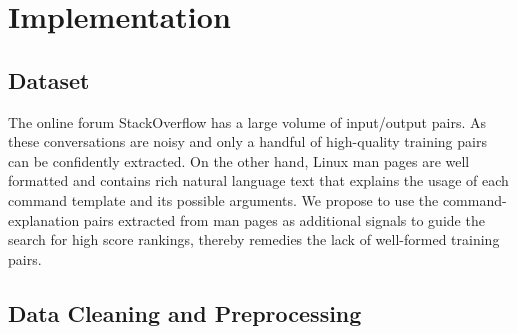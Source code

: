\section{Implementation}

\subsection{Dataset}

The online forum StackOverflow has a large volume of input/output pairs. As these conversations are noisy and only a handful of high-quality training pairs can be confidently extracted. On the other hand, Linux man pages are well formatted and contains rich natural language text that explains the usage of each command template and its possible arguments. We propose to use the command-explanation pairs extracted from man pages as additional signals to guide the search for high score rankings, thereby remedies the lack of well-formed training pairs.

\subsection{Data Cleaning and Preprocessing}